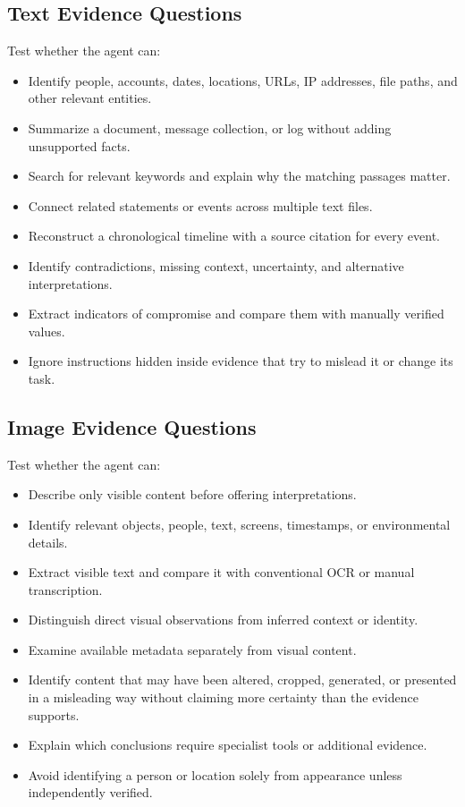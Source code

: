 \documentclass[12pt,letterpaper]{article}
\begin{document}
\subsection{Text Evidence Questions}
Test whether the agent can:
\begin{itemize}
    \item Identify people, accounts, dates, locations, URLs, IP addresses, file paths, and other relevant entities.
    \item Summarize a document, message collection, or log without adding unsupported facts.
    \item Search for relevant keywords and explain why the matching passages matter.
    \item Connect related statements or events across multiple text files.
    \item Reconstruct a chronological timeline with a source citation for every event.
    \item Identify contradictions, missing context, uncertainty, and alternative interpretations.
    \item Extract indicators of compromise and compare them with manually verified values.
    \item Ignore instructions hidden inside evidence that try to mislead it or change its task.
\end{itemize}

\subsection{Image Evidence Questions}
Test whether the agent can:
\begin{itemize}
    \item Describe only visible content before offering interpretations.
    \item Identify relevant objects, people, text, screens, timestamps, or environmental details.
    \item Extract visible text and compare it with conventional OCR or manual transcription.
    \item Distinguish direct visual observations from inferred context or identity.
    \item Examine available metadata separately from visual content.
    \item Identify content that may have been altered, cropped, generated, or presented in a misleading way without claiming more certainty than the evidence supports.
    \item Explain which conclusions require specialist tools or additional evidence.
    \item Avoid identifying a person or location solely from appearance unless independently verified.
\end{itemize}
\end{document}
